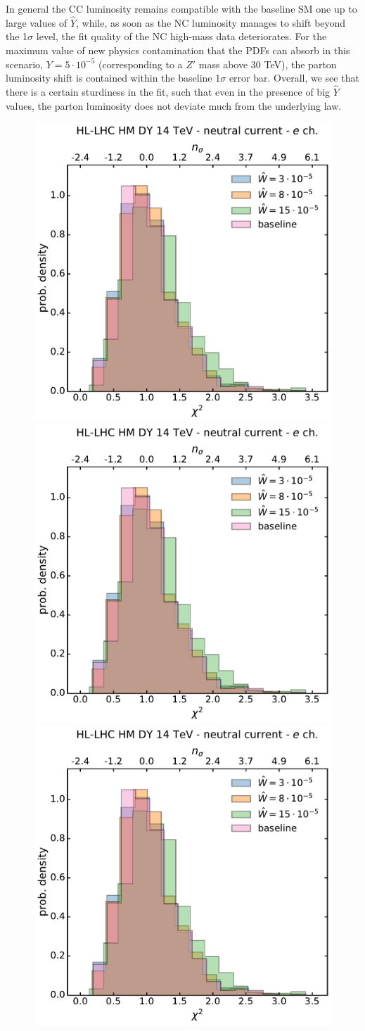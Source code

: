 \documentclass[withindex,glossary]{cam-thesis}
\begin{document}
In general the CC luminosity remains compatible with the baseline SM one up to large values of $\hat{Y}$, while, 
as soon as the NC luminosity manages to shift beyond the 1$\sigma$ level, the fit quality of the NC high-mass data 
deteriorates. For the maximum value of new physics contamination that the PDFs can absorb in this scenario, $Y=5\cdot 10^{-5}$ (corresponding to a $Z'$ mass above 30 TeV), 
the parton luminosity shift is contained within the baseline 1$\sigma$ error bar. 
Overall, we see that there is a certain sturdiness in the fit, such that even in the presence of big $\hat{Y}$ values, the parton luminosity does not deviate much from the underlying law.


\begin{figure}[H]
  \includegraphics[width=0.48\linewidth, page=1]{Figures/chi2_nsigma_W.pdf}
  \includegraphics[width=0.48\linewidth, page=3]{Figures/chi2_nsigma_W.pdf}\\
  \includegraphics[width=0.48\linewidth, page=6]{Figures/chi2_nsigma_W.pdf}

\end{figure}
\end{document}
